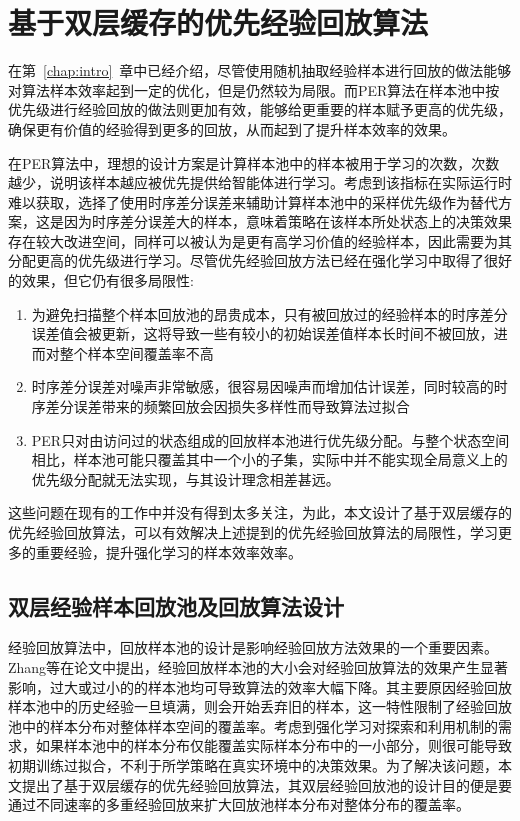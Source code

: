 
\chapter{基于双层缓存的优先经验回放算法}\label{chap:dper}

在第~\ref{chap:intro}~章中已经介绍，尽管使用随机抽取经验样本进行回放的做法能够对算法样本效率起到一定的优化，但是仍然较为局限。而PER算法在样本池中按优先级进行经验回放的做法则更加有效，能够给更重要的样本赋予更高的优先级，确保更有价值的经验得到更多的回放，从而起到了提升样本效率的效果。

在PER算法中，理想的设计方案是计算样本池中的样本被用于学习的次数，次数越少，说明该样本越应被优先提供给智能体进行学习。考虑到该指标在实际运行时难以获取，选择了使用时序差分误差来辅助计算样本池中的采样优先级作为替代方案，这是因为时序差分误差大的样本，意味着策略在该样本所处状态上的决策效果存在较大改进空间，同样可以被认为是更有高学习价值的经验样本，因此需要为其分配更高的优先级进行学习。尽管优先经验回放方法已经在强化学习中取得了很好的效果，但它仍有很多局限性:

\begin{enumerate}[1)]
    \item 为避免扫描整个样本回放池的昂贵成本，只有被回放过的经验样本的时序差分误差值会被更新，这将导致一些有较小的初始误差值样本长时间不被回放，进而对整个样本空间覆盖率不高
    \item 时序差分误差对噪声非常敏感，很容易因噪声而增加估计误差，同时较高的时序差分误差带来的频繁回放会因损失多样性而导致算法过拟合
    \item PER只对由访问过的状态组成的回放样本池进行优先级分配。与整个状态空间相比，样本池可能只覆盖其中一个小的子集，实际中并不能实现全局意义上的优先级分配就无法实现，与其设计理念相差甚远。
\end{enumerate}

这些问题在现有的工作中并没有得到太多关注，为此，本文设计了基于双层缓存的优先经验回放算法，可以有效解决上述提到的优先经验回放算法的局限性，学习更多的重要经验，提升强化学习的样本效率效率。

\section{双层经验样本回放池及回放算法设计}

经验回放算法中，回放样本池的设计是影响经验回放方法效果的一个重要因素。Zhang等\cite{zhang2017deeper}在论文中提出，经验回放样本池的大小会对经验回放算法的效果产生显著影响，过大或过小的的样本池均可导致算法的效率大幅下降。其主要原因经验回放样本池中的历史经验一旦填满，则会开始丢弃旧的样本，这一特性限制了经验回放池中的样本分布对整体样本空间的覆盖率。考虑到强化学习对探索和利用机制的需求，如果样本池中的样本分布仅能覆盖实际样本分布中的一小部分，则很可能导致初期训练过拟合，不利于所学策略在真实环境中的决策效果。为了解决该问题，本文提出了基于双层缓存的优先经验回放算法，其双层经验回放池的设计目的便是要通过不同速率的多重经验回放来扩大回放池样本分布对整体分布的覆盖率。

